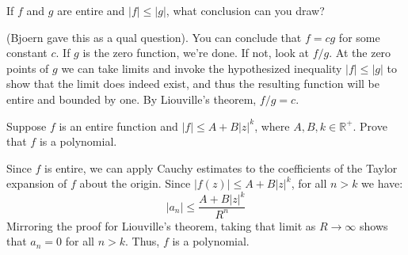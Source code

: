 \documentclass[crop=false,class=article]{standalone}                           %
\begin{document}
    \begin{problem}
        If $f$ and $g$ are entire and $|f|\leq|g|$, what conclusion can you
        draw?
    \end{problem}
    \begin{solution}
        (Bjoern gave this as a qual question). You can conclude that
        $f=cg$ for some constant $c$. If $g$ is the zero function, we're done.
        If not, look at $f/g$. At the zero points of $g$ we can take limits and
        invoke the hypothesized inequality $|f|\leq|g|$ to show that the limit
        does indeed exist, and thus the resulting function will be entire and
        bounded by one. By Liouville's theorem, $f/g=c$.
    \end{solution}
    \begin{problem}
        Suppose $f$ is an entire function and $|f|\leq{A}+B|z|^{k}$, where
        $A,B,k\in\mathbb{R}^{+}$. Prove that $f$ is a polynomial.
    \end{problem}
    \begin{solution}
        Since $f$ is entire, we can apply Cauchy estimates to the coefficients
        of the Taylor expansion of $f$ about the origin. Since
        $|f(z)|\leq{A}+B|z|^{k}$, for all $n>k$ we have:
        \begin{equation}
            |a_{n}|\leq\frac{A+B|z|^{k}}{R^{n}}
        \end{equation}
        Mirroring the proof for Liouville's theorem, taking that limit as
        $R\rightarrow\infty$ shows that $a_{n}=0$ for all $n>k$. Thus, $f$ is
        a polynomial.
    \end{solution}
\end{document}
